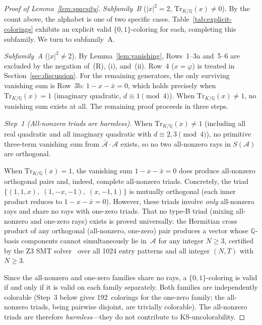 \documentclass[12pt,a4paper]{article}
\newcommand{\Q}{\mathbb{Q}}
\newcommand{\Tr}[1]{\mathrm{Tr}_{K/\Q}\!\left(#1\right)}
\begin{document}
\begin{proof}[Proof of Lemma~\ref{lem:sparsity}]
\noindent\textit{Subfamily~B} ($|x|^2 = 2$, $\Tr{x} \neq 0$).
By the count above, the alphabet is one of two specific cases.
Table~\ref{tab:explicit-colorings} exhibits an explicit valid
$\{0,1\}$-coloring for each, completing this subfamily.  We turn to
subfamily~A.

\smallskip
\noindent\textit{Subfamily~A} ($|x|^2 \neq 2$).
By Lemma~\ref{lem:vanishing}, Rows~1--3a and~5--6 are excluded by
the negation of~(R), (i), and~(ii).  Row~4 ($x = \varphi$) is
treated in Section~\ref{sec:discussion}.  For the remaining
generators, the only surviving vanishing sum is Row~3b:
$1 - x - \bar{x} = 0$, which holds precisely when $\Tr{x} = 1$
(imaginary quadratic, $d \equiv 1 \pmod{4}$).  When $\Tr{x} \neq 1$,
no vanishing sum exists at all.  The remaining proof proceeds in
three steps.

\medskip
\noindent\textit{Step~1 (All-nonzero triads are harmless).}
When $\Tr{x} \neq 1$ (including all real quadratic and all imaginary
quadratic with $d \equiv 2, 3 \pmod{4}$), no primitive three-term
vanishing sum from $\bar{\mathcal{A}} \cdot \mathcal{A}$ exists,
so no two all-nonzero rays in $S(\mathcal{A})$ are orthogonal.

When $\Tr{x} = 1$, the vanishing sum $1 - x - \bar{x} = 0$ does
produce all-nonzero orthogonal pairs and, indeed, complete
all-nonzero triads.  Concretely, the triad
$\{(1, 1, x),\; (1, -x, -1),\; (x, -1, 1)\}$ is mutually orthogonal
(each inner product reduces to $1 - x - \bar{x} = 0$).
However, these triads involve \emph{only} all-nonzero rays and share
no rays with one-zero triads.  That no type-B triad (mixing
all-nonzero and one-zero rays) exists is proved universally: the
Hermitian cross product of any orthogonal (all-nonzero, one-zero) pair
produces a vector whose $\Q$-basis components cannot simultaneously
lie in~$\mathcal{A}$ for any integer $N \geq 3$, certified by the Z3
SMT solver~\cite{deMouraBjorner2008} over all 1024 entry patterns and
all integer $(N, T)$ with $N \geq 3$.

Since the all-nonzero and one-zero families share no rays,
a $\{0,1\}$-coloring is valid if and only if it is valid on each
family separately.  Both families are independently colorable
(Step~3 below gives 192~colorings for the one-zero family; the
all-nonzero triads, being pairwise disjoint, are trivially colorable).
The all-nonzero triads are therefore \emph{harmless}---they do not
contribute to KS-uncolorability.


\end{proof}
\end{document}
